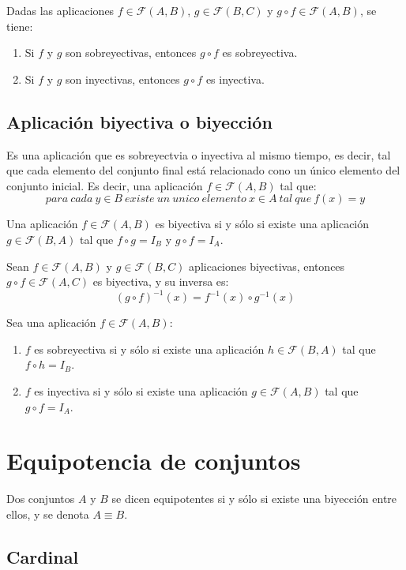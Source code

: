 Dadas las aplicaciones $f \in \mathcal{F}(A,B)$, $g \in \mathcal{F}(B,C)$ y  $g \circ f \in \mathcal{F}(A,B)$, se tiene:
\begin{enumerate}
\item Si $f$ y $g$ son sobreyectivas, entonces $g \circ f$ es sobreyectiva.
\item Si $f$ y $g$ son inyectivas, entonces $g \circ f$ es inyectiva.
\end{enumerate}

\subsection{Aplicación biyectiva o biyección}

Es una aplicación que es sobreyectvia o inyectiva al mismo tiempo, es decir, tal que cada elemento del conjunto final está relacionado cono un único elemento del conjunto inicial. Es decir,  una aplicación $f \in \mathcal{F}(A,B)$ tal que:
\[
para\ cada\ y \in B\ existe\ un\ unico\ elemento\ x \in A\ tal\ que\ f(x)=y
\]

Una aplicación $f \in \mathcal{F}(A,B)$ es biyectiva si y sólo si existe una aplicación $g \in \mathcal{F}(B,A)$ tal que $f \circ g = I_B$ y $g \circ f = I_A$.

Sean $f \in \mathcal{F}(A,B)$ y $g \in \mathcal{F}(B,C)$ aplicaciones biyectivas, entonces $g \circ f \in \mathcal{F}(A,C)$ es biyectiva, y su inversa es:
\[
(g \circ f)^{-1}(x)=f^{-1}(x) \circ g^{-1}(x)
\]

Sea una aplicación $f \in \mathcal{F}(A,B)$:
\begin{enumerate}
\item $f$ es sobreyectiva si y sólo si existe una aplicación $h \in \mathcal{F}(B,A)$ tal que $f \circ h = I_B$.
\item $f$ es inyectiva si y sólo si existe una aplicación $g \in \mathcal{F}(A,B)$ tal que $g \circ f = I_A$.
\end{enumerate}

\section{Equipotencia de conjuntos}

Dos conjuntos $A$ y $B$ se dicen equipotentes si y sólo si existe una biyección entre ellos, y se denota $A \equiv B$.

\subsection{Cardinal}

